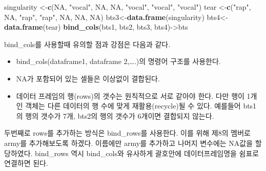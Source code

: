 \documentclass[
]{book}
\newenvironment{Shaded}{\begin{snugshade}}{\end{snugshade}}
\newcommand{\ConstantTok}[1]{\textcolor[rgb]{0.56,0.35,0.01}{#1}}
\newcommand{\FunctionTok}[1]{\textcolor[rgb]{0.13,0.29,0.53}{\textbf{#1}}}
\newcommand{\NormalTok}[1]{#1}
\newcommand{\OtherTok}[1]{\textcolor[rgb]{0.56,0.35,0.01}{#1}}
\newcommand{\StringTok}[1]{\textcolor[rgb]{0.31,0.60,0.02}{#1}}
\providecommand{\tightlist}{%
  \setlength{\itemsep}{0pt}\setlength{\parskip}{0pt}}
\begin{document}
\begin{Shaded}
\begin{Highlighting}[]
\NormalTok{singularity }\OtherTok{\textless{}{-}}\FunctionTok{c}\NormalTok{(}\ConstantTok{NA}\NormalTok{, }\StringTok{"vocal"}\NormalTok{, }\ConstantTok{NA}\NormalTok{, }\ConstantTok{NA}\NormalTok{, }\StringTok{"vocal"}\NormalTok{, }\StringTok{"vocal"}\NormalTok{, }\StringTok{"vocal"}\NormalTok{)}
\NormalTok{tear }\OtherTok{\textless{}{-}}\FunctionTok{c}\NormalTok{(}\StringTok{"rap"}\NormalTok{, }\ConstantTok{NA}\NormalTok{, }\StringTok{"rap"}\NormalTok{, }\StringTok{"rap"}\NormalTok{, }\ConstantTok{NA}\NormalTok{, }\ConstantTok{NA}\NormalTok{, }\ConstantTok{NA}\NormalTok{)}
\NormalTok{bts3}\OtherTok{\textless{}{-}}\FunctionTok{data.frame}\NormalTok{(singularity)}
\NormalTok{bts4}\OtherTok{\textless{}{-}}\FunctionTok{data.frame}\NormalTok{(tear)}
\FunctionTok{bind\_cols}\NormalTok{(bts1, bts2, bts3, bts4)}\OtherTok{{-}\textgreater{}}\NormalTok{bts}
\end{Highlighting}
\end{Shaded}

bind\_cols를 사용할때 유의할 점과 강점은 다음과 같다.

\begin{itemize}
\tightlist
\item
  bind\_cols(dataframe1, dataframe 2,\ldots.)의 명령어 구조를 사용한다.
\item
  NA가 포함되어 있는 셀들은 이상없이 결합된다.
\item
  데이터 프레임의 행(rows)의 갯수는 원칙적으로 서로 같아야 한다. 다만 행이 1개인 객체는 다른 데이터의 행 수에 맞게 재활용(recycle)될 수 있다. 예를들어 bts1의 행의 갯수가 7개, bts2의 행의 갯수가 6개이면 결합되지 않는다.
\end{itemize}

두번째로 rows를 추가하는 방식은 bind\_rows를 사용한다. 이를 위해 제8의 멤버로 army를 추가해보도록 하겠다. 이름에만 army를 추가하고 나머지 변수에는 NA값을 할당하였다. bind\_rows 역시 bind\_cols와 유사하게 괄호안에 데이터프레임명을 쉼표로 연결하면 된다.
\end{document}
